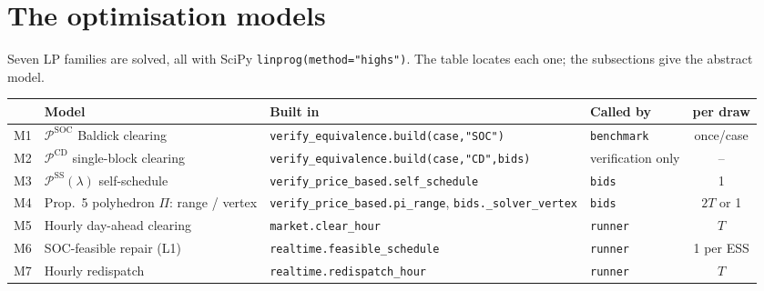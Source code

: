 \documentclass[10pt,a4paper]{article}
\newcommand{\code}[1]{\texttt{#1}}
\begin{document}
\section{The optimisation models}

Seven LP families are solved, all with SciPy \code{linprog(method="highs")}. The table locates each one; the
subsections give the abstract model.

\begin{center}\small
\begin{tabularx}{\textwidth}{@{}c>{\raggedright\arraybackslash}p{3.2cm}>{\raggedright\arraybackslash}X>{\raggedright\arraybackslash}p{2.9cm}c@{}}
\toprule
& Model & Built in & Called by & per draw \\
\midrule
M1 & $\mathcal P^{\text{SOC}}$ Baldick clearing & \code{verify\_equivalence.build(case,"SOC")} & \code{benchmark} & once/case \\
M2 & $\mathcal P^{\text{CD}}$ single-block clearing & \code{verify\_equivalence.build(case,"CD",bids)} & verification only & -- \\
M3 & $\mathcal P^{\text{SS}}(\lambda)$ self-schedule & \code{verify\_price\_based.self\_schedule} & \code{bids} & 1 \\
M4 & Prop.~5 polyhedron $\Pi$: range / vertex & \code{verify\_price\_based.pi\_range}, \code{bids.\_solver\_vertex} & \code{bids} & $2T$ or 1 \\
M5 & Hourly day-ahead clearing & \code{market.clear\_hour} & \code{runner} & $T$ \\
M6 & SOC-feasible repair (L1) & \code{realtime.feasible\_schedule} & \code{runner} & 1 per ESS \\
M7 & Hourly redispatch & \code{realtime.redispatch\_hour} & \code{runner} & $T$ \\
\bottomrule
\end{tabularx}
\end{center}
\end{document}
